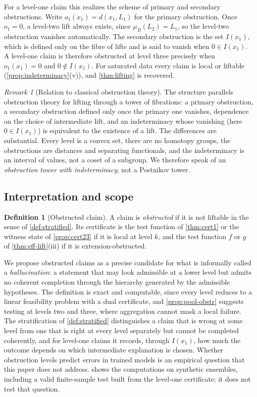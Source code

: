 \documentclass[11pt]{article}
\theoremstyle{definition}
\newtheorem{definition}[theorem]{Definition}
\theoremstyle{remark}
\newtheorem{remark}[theorem]{Remark}
\begin{document}
For a level-one claim this realizes the scheme of primary and secondary obstructions. Write
$o_1(x_1)=d(x_1,L_1)$ for the primary obstruction. Once $o_1=0$, a level-two lift always exists, since
$\mu_B(L_2)=L_1$, so the level-two obstruction vanishes automatically. The secondary obstruction is the
set $I(x_1)$, which is defined only on the fibre of lifts and is said to vanish when $0\in I(x_1)$. A
level-one claim is therefore obstructed at level three precisely when $o_1(x_1)=0$ and $0\notin
I(x_1)$. For saturated data every claim is local or liftable (\cref{prop:indeterminacy}(v)), and
\cref{thm:lifting} is recovered.

\begin{remark}[Relation to classical obstruction theory]\label{rem:obstruction-analogy}
The structure parallels obstruction theory for lifting through a tower of fibrations: a primary
obstruction, a secondary obstruction defined only once the primary one vanishes, dependence on the
choice of intermediate lift, and an indeterminacy whose vanishing (here $0\in I(x_1)$) is equivalent to
the existence of a lift. The differences are substantial. Every level is a convex set, there are no
homotopy groups, the obstructions are distances and separating functionals, and the indeterminacy is
an interval of values, not a coset of a subgroup. We therefore speak of an \emph{obstruction tower
with indeterminacy}, not a Postnikov tower.
\end{remark}

\subsection{Interpretation and scope}

\begin{definition}[Obstructed claim]
A claim is \emph{obstructed} if it is not liftable in the sense of \cref{def:stratified}. Its
certificate is the test function of \cref{thm:cert1} or the witness state of \cref{prop:cert23} if it
is local at level $k$, and the test function $f$ or $g$ of \cref{thm:eff-lift}(iii) if it is
extension-obstructed.
\end{definition}

We propose obstructed claims as a precise candidate for what is informally called a
\emph{hallucination}: a statement that may look admissible at a lower level but admits no coherent
completion through the hierarchy generated by the admissible hypotheses. The definition is exact
and computable, since every level reduces to a linear feasibility problem with a dual certificate,
and \cref{prop:pool-obstr} suggests testing at levels two and three, where aggregation cannot mask a
local failure. The stratification of \cref{def:stratified} distinguishes a claim that is wrong at some
level from one that is right at every level separately but cannot be completed coherently, and for
level-one claims it records, through $I(x_1)$, how much the outcome depends on which intermediate
explanation is chosen. Whether obstruction levels predict errors in trained models is an empirical question that
this paper does not address.  shows the computations on synthetic ensembles, including a valid
finite-sample test built from the level-one certificate; it does not test that question.
\end{document}
